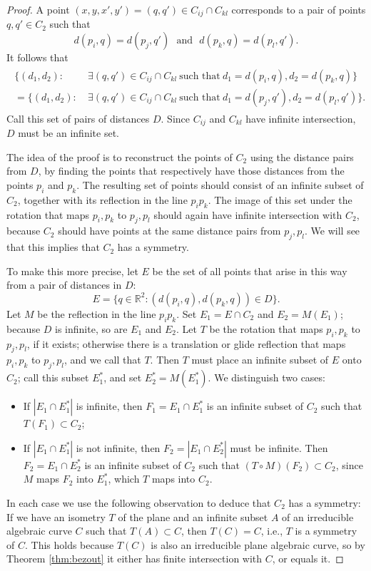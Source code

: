 \documentclass[12pt]{article}
\newcommand{\RR}{\mathbb R}
\begin{document}
\begin{proof}
 A point $(x,y,x',y') = (q,q')\in C_{ij}\cap C_{kl}$ 
 corresponds to a pair of points $q, q'\in C_2$ 
 such that 
 $$d(p_i, q) = d(p_j, q') ~~~\text{and}~~~d(p_k, q) = d(p_l, q').$$
 It follows that
 \begin{align*}
  \begin{split}
   \{ (d_1,d_2):&~\exists (q, q')\in C_{ij}\cap C_{kl}~\text{such that}~ d_1 = d(p_i, q),d_2 = d(p_k, q)\}\\
   = \{ (d_1,d_2):&~\exists (q, q')\in C_{ij}\cap C_{kl}~\text{such that}~ d_1 = d(p_j, q'),d_2 = d(p_l, q')\}.
  \end{split}
 \end{align*}
 Call this set of pairs of distances $D$.
 Since $C_{ij}$ and $C_{kl}$ have infinite intersection,
 $D$ must be an infinite set.
 
 The idea of the proof is to reconstruct the points of $C_2$ using the distance pairs from $D$,
 by finding the points that respectively have those distances from the points $p_i$ and $p_k$.
 The resulting set of points should consist of an infinite subset of $C_2$, 
 together with its reflection in the line $p_ip_k$.
 The image of this set under the rotation that maps $p_i,p_k$ to $p_j,p_l$ 
 should again have infinite intersection with $C_2$, 
 because $C_2$ should have points at the same distance pairs from $p_j, p_l$.  
 We will see that this implies that $C_2$ has a symmetry.
  
 To make this more precise, 
 let $E$ be the set of all points that arise in this way from a pair of distances in $D$:
 $$E = \{q\in \RR^2:\left (d(p_i,q), d(p_k,q)\right)\in D\}.$$
 Let $M$ be the reflection in the line $p_ip_k$.
 Set $E_1 = E\cap C_2$ and $E_2 = M(E_1)$; 
 because $D$ is infinite, so are $E_1$ and $E_2$.
 Let $T$ be the rotation that maps $p_i,p_k$ to $p_j,p_l$, if it exists; 
 otherwise there is a translation or glide reflection that maps $p_i,p_k$ to $p_j,p_l$,
 and we call that $T$.
 Then $T$ must place an infinite subset of $E$ onto $C_2$; 
 call this subset $E_1^*$, and set $E_2^* = M(E_1^*)$.
 We distinguish two cases:
 \begin{itemize}
  \item[(1)] If $|E_1\cap E_1^*|$ is infinite, 
  then $F_1 = E_1\cap E_1^*$ is an infinite subset of $C_2$
  such that $T(F_1) \subset C_2$;
  \item[(2)] 
  If $|E_1\cap E_1^*|$ is not infinite, 
  then $F_2 = |E_1\cap E_2^*|$ must be infinite.
  Then $F_2 = E_1\cap E_2^*$ is an infinite subset of $C_2$
  such that $(T\circ M)(F_2)\subset C_2$, since $M$ maps $F_2$ into $E_1^*$, 
  which $T$ maps into $C_2$.
 \end{itemize} 
 In each case we use the following observation
 to deduce that $C_2$ has a symmetry:
 If we have an isometry $T$ of the plane and an infinite subset $A$ 
 of an irreducible algebraic curve $C$ such that $T(A)\subset C$,
 then $T(C) = C$, i.e., $T$ is a symmetry of $C$.
 This holds because $T(C)$ is also an irreducible plane algebraic curve, 
 so by Theorem \ref{thm:bezout} it either has finite intersection with $C$, or equals it.
  

\end{proof}
\end{document}
